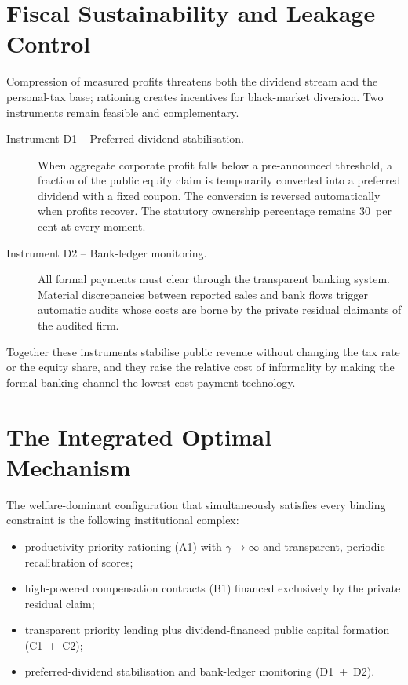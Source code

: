 \documentclass[12pt,anyside]{book}
\theoremstyle{definition}
\theoremstyle{plain}
\theoremstyle{remark}
\begin{document}
\section{Fiscal Sustainability and Leakage Control}

Compression of measured profits threatens both the dividend stream and the personal-tax base; rationing creates incentives for black-market diversion. Two instruments remain feasible and complementary.

\begin{description}
\item[Instrument D1 -- Preferred-dividend stabilisation.]  
When aggregate corporate profit falls below a pre-announced threshold, a fraction of the public equity claim is temporarily converted into a preferred dividend with a fixed coupon. The conversion is reversed automatically when profits recover. The statutory ownership percentage remains 30~per cent at every moment.

\item[Instrument D2 -- Bank-ledger monitoring.]  
All formal payments must clear through the transparent banking system. Material discrepancies between reported sales and bank flows trigger automatic audits whose costs are borne by the private residual claimants of the audited firm.
\end{description}

Together these instruments stabilise public revenue without changing the tax rate or the equity share, and they raise the relative cost of informality by making the formal banking channel the lowest-cost payment technology.

\section{The Integrated Optimal Mechanism}

The welfare-dominant configuration that simultaneously satisfies every binding constraint is the following institutional complex:

\begin{itemize}
\item productivity-priority rationing (A1) with $\gamma\to\infty$ and transparent, periodic recalibration of scores;
\item high-powered compensation contracts (B1) financed exclusively by the private residual claim;
\item transparent priority lending plus dividend-financed public capital formation (C1~+~C2);
\item preferred-dividend stabilisation and bank-ledger monitoring (D1~+~D2).
\end{itemize}
\end{document}
